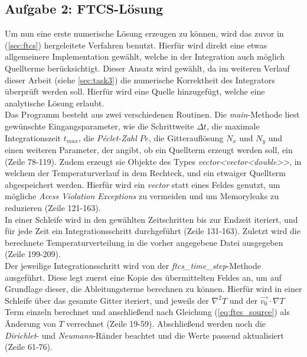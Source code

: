\documentclass[12pt,a4paper,titlepage,headinclude,bibtotoc]{scrartcl}
\begin{document}
\subsection{Aufgabe 2: FTCS-Lösung}
\label{sec:task2}
Um nun eine erste numerische Lösung erzeugen zu können, wird das zuvor in (\ref{sec:ftcs}) hergeleitete Verfahren benutzt. Hierfür wird direkt eine etwas allgemeinere Implementation gewählt, welche in der Integration auch möglich Quellterme berücksichtigt. Dieser Ansatz wird gewählt, da im weiteren Verlauf dieser Arbeit (siehe \ref{sec:task3}) die numerische Korrektheit des Integrators überprüft werden soll. Hierfür wird eine Quelle hinzugefügt, welche eine analytische Lösung erlaubt.\\
Das Programm besteht aus zwei verschiedenen Routinen. Die \textit{main}-Methode liest gewünschte Eingangsparameter, wie die Schrittweite $\Delta t$, die maximale Integrationszeit $t_{max}$, die \textit{Péclet-Zahl} $Pe$, die Gitterauflösung $N_x$ und $N_y$ und einen weiteren Parameter, der angibt, ob ein Quellterm erzeugt werden soll, ein (Zeile 78-119). Zudem erzeugt sie Objekte des Types \textit{vector\textless vector\textless double\textgreater \textgreater}, in welchem der Temperaturverlauf in dem Rechteck, und ein etwaiger Quellterm abgespeichert werden. Hierfür wird ein \textit{vector} statt eines Feldes genutzt, um mögliche \textit{Acess Violation Exceptions} zu vermeiden und um Memoryleaks zu reduzieren (Zeile 121-163).\\
In einer Schleife wird in den gewählten Zeitschritten bis zur Endzeit iteriert, und für jede Zeit ein Integrationsschritt durchgeführt (Zeile 131-163). Zuletzt wird die berechnete Temperaturverteilung in die vorher angegebene Datei ausgegeben (Zeile 199-209).\\
Der jeweilige Integrationsschritt wird von der \textit{ftcs\_time\_step}-Methode ausgeführt. Diese legt zuerst eine Kopie des übermittelten Feldes an, um auf Grundlage dieser, die Ableitungsterme berechnen zu können. Hierfür wird in einer Schleife über das gesamte Gitter iteriert, und jeweils der $\nabla^2 T$ und der $\vec{v_0} \cdot \nabla T$ Term einzeln berechnet und anschließend nach Gleichung (\ref{eq:ftcs_source}) als Änderung von $T$ verrechnet (Zeile 19-59). Abschließend werden noch die \textit{Dirichlet}- und \textit{Neumann}-Ränder beachtet und die Werte passend aktualisiert (Zeile 61-76). 
\end{document}
